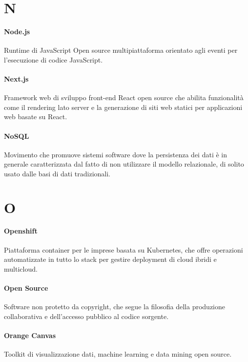 \documentclass[]{article}
\begin{document}
	\newpage
	
	\section*{N}
	
	\paragraph*{Node.js}
	Runtime di JavaScript Open source multipiattaforma orientato agli eventi per l'esecuzione di codice JavaScript.
	
	\paragraph*{Next.js}
	Framework web di sviluppo front-end React open source che abilita funzionalità come il rendering lato server e la generazione di siti web statici per applicazioni web basate su React.
	
	\paragraph*{NoSQL} 
	Movimento che promuove sistemi software dove la persistenza dei dati è in generale caratterizzata dal fatto di non utilizzare il modello relazionale, di solito usato dalle basi di dati tradizionali.
	
	\newpage
	
	\section*{O}
	
	\paragraph*{Openshift}
	Piattaforma container per le imprese basata su Kubernetes, che offre operazioni automatizzate in tutto lo stack per gestire deployment di cloud ibridi e multicloud.
	
	\paragraph*{Open Source}
	Software non protetto da copyright, che segue la filosofia della produzione collaborativa e dell'accesso pubblico al codice sorgente.
	
	\paragraph*{Orange Canvas}
	Toolkit di visualizzazione dati, machine learning e data mining open source.
	
\end{document}

